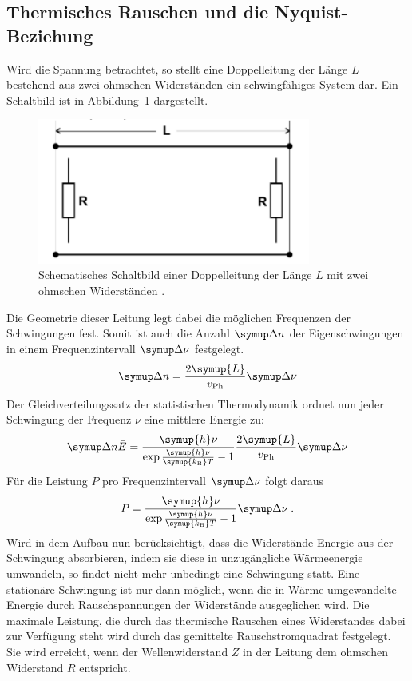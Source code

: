 \subsection{Thermisches Rauschen und die Nyquist-Beziehung}
%
Wird die Spannung betrachtet, so stellt eine Doppelleitung der Länge $L$ bestehend aus zwei ohmschen Widerständen ein schwingfähiges System dar. Ein Schaltbild ist in Abbildung~\ref{fig:doppelleitung} dargestellt.
%
\begin{figure}
  \includegraphics[width=0.8\textwidth]{figures/Doppelleitung.pdf}
  \caption{Schematisches Schaltbild einer Doppelleitung der Länge $L$ mit zwei ohmschen Widerständen \cite{V57}.}
  \label{fig:doppelleitung}
\end{figure}
%
Die Geometrie dieser Leitung legt dabei die möglichen Frequenzen der Schwingungen fest. Somit ist auch die Anzahl $\upD n$ der Eigenschwingungen in einem Frequenzintervall $\upD\nu$ festgelegt.
%
\begin{equation}
  \upD n=\frac{2\symup{L}}{v_\text{Ph}}\upD\nu
\end{equation}
%
Der Gleichverteilungssatz der statistischen Thermodynamik ordnet nun jeder Schwingung der Frequenz $\nu$ eine mittlere Energie zu:
%
\begin{equation}
  \upD n\bar{E}=\frac{\symup{h}\nu}{\exp{\frac{\symup{h}\nu}{\symup{k_\text{B}}T}}-1}\frac{2\symup{L}}{v_\text{Ph}}\upD\nu
\end{equation}
%
Für die Leistung $P$ pro Frequenzintervall $\upD\nu$ folgt daraus
%
\begin{equation}
  P=\frac{\symup{h}\nu}{\exp{\frac{\symup{h}\nu}{\symup{k_\text{B}}T}}-1}\upD\nu\; .
\end{equation}
%
Wird in dem Aufbau nun berücksichtigt, dass die Widerstände Energie aus der Schwingung absorbieren, indem sie diese in unzugängliche Wärmeenergie umwandeln, so findet nicht mehr unbedingt eine Schwingung statt. Eine stationäre Schwingung ist nur dann möglich, wenn die in Wärme umgewandelte Energie durch Rauschspannungen der Widerstände ausgeglichen wird. Die maximale Leistung, die durch das thermische Rauschen eines Widerstandes dabei zur Verfügung steht wird durch das gemittelte Rauschstromquadrat festgelegt. Sie wird erreicht, wenn der Wellenwiderstand $Z$ in der Leitung dem ohmschen Widerstand $R$ entspricht.
